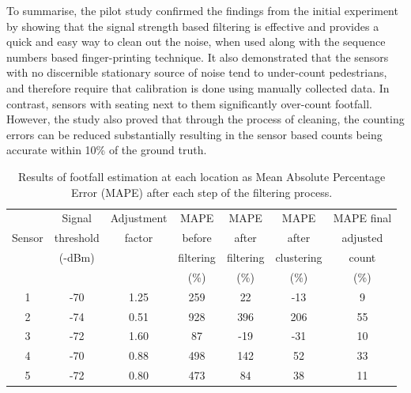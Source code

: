 To summarise, the pilot study confirmed the findings from the initial experiment by showing that the signal strength based filtering is effective and provides a quick and easy way to clean out the noise, when used along with the sequence numbers based finger-printing technique.
It also demonstrated that the sensors with no discernible  stationary  source  of  noise  tend to under-count pedestrians, and therefore require that calibration is done using manually collected data.
In contrast, sensors with seating next to them significantly over-count footfall.
However, the study also proved that through the process of cleaning, the counting errors can be reduced substantially resulting in the sensor based counts being accurate within 10\% of the ground truth.

\begin{centering}
\begin{table}
\footnotesize
\caption{Results of footfall estimation at each location as Mean Absolute Percentage Error (MAPE) after each step of the filtering process.}
{\begin{tabular}{ccccccc} 
\toprule
& Signal    & Adjustment & MAPE      & MAPE      & MAPE       & MAPE final \\
Sensor  & threshold & factor     & before    & after     & after    & adjusted\\
& (-dBm)    &            & filtering & filtering & clustering & count\\
&           &            & (\%)      & (\%)      & (\%)       & (\%)\\
\midrule
1 & -70 & 1.25 & 259 &  22 & -13 &  9 \\
2 & -74 & 0.51 & 928 & 396 & 206 & 55 \\
3 & -72 & 1.60 &  87 & -19 & -31 & 10 \\
4 & -70 & 0.88 & 498 & 142 &  52 & 33 \\
5 & -72 & 0.80 & 473 &  84 &  38 & 11 \\
\bottomrule
\end{tabular}}
\label{table:processing:pilot:results}
\end{table}
\end{centering}

